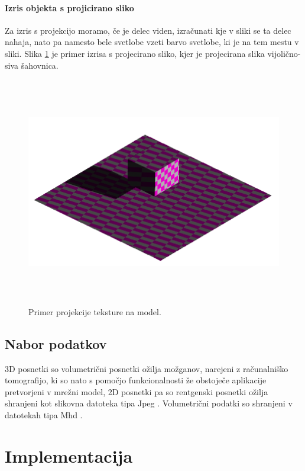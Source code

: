 \documentclass[a4paper, 12pt]{book}
\begin{document}
\subsubsection*{Izris objekta s projicirano sliko}
Za izris s projekcijo moramo, če je delec viden, izračunati kje v sliki se ta delec nahaja, nato pa namesto bele svetlobe vzeti barvo svetlobe, ki je na tem mestu v sliki. Slika \ref{teksturaprojecirananamodel} je primer izrisa s projecirano sliko, kjer je projecirana slika vijolično-siva šahovnica.

\begin{figure}[h]
\begin{center}
\includegraphics[width=\textwidth, height=10cm, keepaspectratio=true]{Tekstura_projecirana_na_model.png}
\end{center}
\caption{Primer projekcije teksture na model.}
\label{teksturaprojecirananamodel}
\end{figure}

\section{Nabor podatkov}
3D posnetki so volumetrični posnetki ožilja možganov, narejeni z računalniško tomografijo, ki so nato s pomočjo funkcionalnosti že obstoječe aplikacije pretvorjeni v mrežni model, 2D posnetki pa so rentgenski posnetki ožilja shranjeni kot slikovna datoteka tipa Jpeg \cite{jpeg}. Volumetrični podatki so shranjeni v datotekah tipa Mhd \cite{mhd}.


\chapter{Implementacija}
\end{document}
